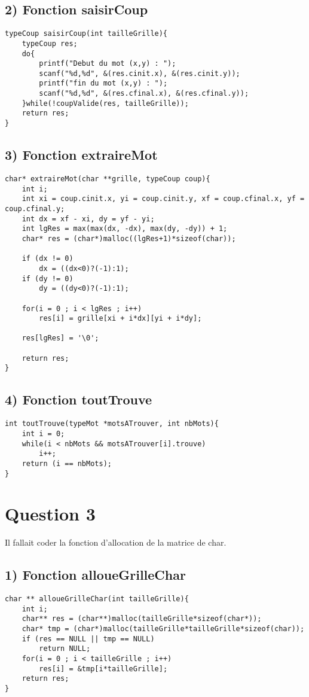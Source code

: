 \documentclass[a4paper,11pt]{article}
\begin{document}
\subsection*{2) Fonction saisirCoup}
\begin{lstlisting}[caption=La fonction saisirCoup]
typeCoup saisirCoup(int tailleGrille){
	typeCoup res;
	do{
		printf("Debut du mot (x,y) : ");
		scanf("%d,%d", &(res.cinit.x), &(res.cinit.y));
		printf("fin du mot (x,y) : ");
		scanf("%d,%d", &(res.cfinal.x), &(res.cfinal.y));
	}while(!coupValide(res, tailleGrille));
	return res;
}
\end{lstlisting}

\subsection*{3) Fonction extraireMot}
\begin{lstlisting}[caption=La fonction extraireMot]
char* extraireMot(char **grille, typeCoup coup){
	int i;
	int xi = coup.cinit.x, yi = coup.cinit.y, xf = coup.cfinal.x, yf = coup.cfinal.y;
	int dx = xf - xi, dy = yf - yi;
	int lgRes = max(max(dx, -dx), max(dy, -dy)) + 1;
	char* res = (char*)malloc((lgRes+1)*sizeof(char));

	if (dx != 0)
		dx = ((dx<0)?(-1):1);
	if (dy != 0)
		dy = ((dy<0)?(-1):1);

	for(i = 0 ; i < lgRes ; i++)
		res[i] = grille[xi + i*dx][yi + i*dy];

	res[lgRes] = '\0';

	return res;
}
\end{lstlisting}

\newpage{}
\subsection*{4) Fonction toutTrouve}
\begin{lstlisting}[caption=La fonction toutTrouve]
int toutTrouve(typeMot *motsATrouver, int nbMots){
	int i = 0;
	while(i < nbMots && motsATrouver[i].trouve)
		i++;
	return (i == nbMots);
}
\end{lstlisting}

\section*{Question 3}

Il fallait coder la fonction d'allocation de la matrice de char.

\subsection*{1) Fonction alloueGrilleChar}
\begin{lstlisting}[caption=La fonction alloueGrilleChar]
char ** alloueGrilleChar(int tailleGrille){
	int i;
	char** res = (char**)malloc(tailleGrille*sizeof(char*));
	char* tmp = (char*)malloc(tailleGrille*tailleGrille*sizeof(char));
	if (res == NULL || tmp == NULL)
		return NULL;
	for(i = 0 ; i < tailleGrille ; i++)
		res[i] = &tmp[i*tailleGrille];
	return res;
}
\end{lstlisting}
\end{document}
